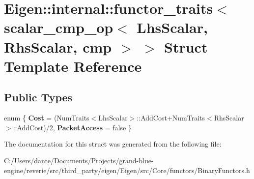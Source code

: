 \hypertarget{struct_eigen_1_1internal_1_1functor__traits_3_01scalar__cmp__op_3_01_lhs_scalar_00_01_rhs_scalar_00_01cmp_01_4_01_4}{}\section{Eigen\+::internal\+::functor\+\_\+traits$<$ scalar\+\_\+cmp\+\_\+op$<$ Lhs\+Scalar, Rhs\+Scalar, cmp $>$ $>$ Struct Template Reference}
\label{struct_eigen_1_1internal_1_1functor__traits_3_01scalar__cmp__op_3_01_lhs_scalar_00_01_rhs_scalar_00_01cmp_01_4_01_4}
\subsection*{Public Types}
\begin{DoxyCompactItemize}
\item 
\mbox{\label{struct_eigen_1_1internal_1_1functor__traits_3_01scalar__cmp__op_3_01_lhs_scalar_00_01_rhs_scalar_00_01cmp_01_4_01_4_a73d443dec7bc0fb5d52ef99f5b732e56}} 
enum \{ {\bfseries Cost} = (Num\+Traits$<$Lhs\+Scalar$>$\+::Add\+Cost+\+Num\+Traits$<$Rhs\+Scalar$>$\+::Add\+Cost)/2, 
{\bfseries Packet\+Access} = false
 \}
\end{DoxyCompactItemize}


The documentation for this struct was generated from the following file\+:\begin{DoxyCompactItemize}
\item 
C\+:/\+Users/dante/\+Documents/\+Projects/grand-\/blue-\/engine/reverie/src/third\+\_\+party/eigen/\+Eigen/src/\+Core/functors/Binary\+Functors.\+h\end{DoxyCompactItemize}
